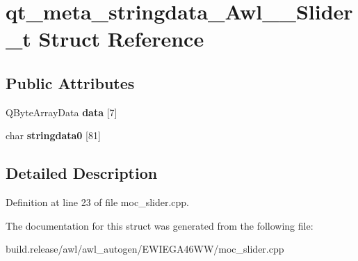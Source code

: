 \hypertarget{structqt__meta__stringdata___awl_____slider__t}{}\section{qt\+\_\+meta\+\_\+stringdata\+\_\+\+Awl\+\_\+\+\_\+\+Slider\+\_\+t Struct Reference}
\label{structqt__meta__stringdata___awl_____slider__t}
\subsection*{Public Attributes}
\begin{DoxyCompactItemize}
\item 
\mbox{\label{structqt__meta__stringdata___awl_____slider__t_aab99ce8c2e804944520b0afebcfff470}} 
Q\+Byte\+Array\+Data {\bfseries data} \mbox{[}7\mbox{]}
\item 
\mbox{\label{structqt__meta__stringdata___awl_____slider__t_add11f716045dccc0a9b26855cce9cebb}} 
char {\bfseries stringdata0} \mbox{[}81\mbox{]}
\end{DoxyCompactItemize}


\subsection{Detailed Description}


Definition at line 23 of file moc\+\_\+slider.\+cpp.



The documentation for this struct was generated from the following file\+:\begin{DoxyCompactItemize}
\item 
build.\+release/awl/awl\+\_\+autogen/\+E\+W\+I\+E\+G\+A46\+W\+W/moc\+\_\+slider.\+cpp\end{DoxyCompactItemize}
